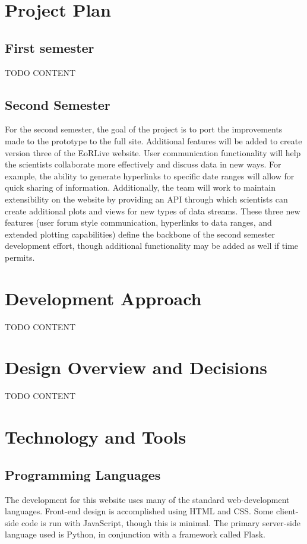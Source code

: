 \documentclass[12pt]{article}
\begin{document}
\begin{spacing}{1.5}
\section{Project Plan}
\subsection{First semester}
TODO CONTENT
\subsection{Second Semester}
For the second semester, the goal of the project is to port the improvements made to the prototype to the full site. Additional features will be added to create version three of the EoRLive website. User communication functionality will help the scientists collaborate more effectively and discuss data in new ways. For example, the ability to generate hyperlinks to specific date ranges will allow for quick sharing of information. Additionally, the team will work to maintain extensibility on the website by providing an API through which scientists can create additional plots and views for new types of data streams. These three new features (user forum style communication, hyperlinks to data ranges, and extended plotting capabilities) define the backbone of the second semester development effort, though additional functionality may be added as well if time permits.

\section{Development Approach}
TODO CONTENT

\section{Design Overview and Decisions}
TODO CONTENT

\section{Technology and Tools}
\subsection{Programming Languages}
The development for this website uses many of the standard web-development languages. Front-end design is accomplished using HTML and CSS. Some client-side code is run with JavaScript, though this is minimal. The primary server-side language used is Python, in conjunction with a framework called Flask. 


\end{spacing}
\end{document}

